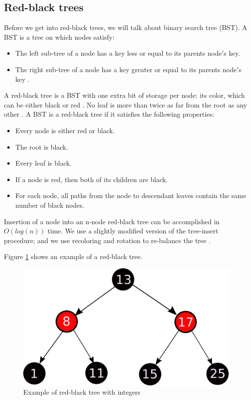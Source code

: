 \documentclass{sig-alternate-05-2015}
\begin{document}
    \subsection{Red-black trees}
      Before we get into red-black trees, we will talk about binary search tree (BST). A BST is a tree on which nodes satisfy:
      \begin{itemize}
        \item The left sub-tree of a node has a key less or equal to its parents node$'$s key.
        \item The right sub-tree of a node has a key greater or equal to its parents node$'$s key \cite{Tuto:Data}.
      \end{itemize}
      A red-black tree is a BST with one extra bit of storage per node: its color, which can be either black or red \cite{Cormen:Algorithms}.
      No leaf is more than twice as far from the root as any other \cite{Black:RBTree}.
      A BST is a red-black tree if it satisfies the following properties:
      \begin{itemize}
        \item Every node is either red or black.
        \item The root is black.
        \item Every leaf is black.
        \item If a node is red, then both of its children are black.
        \item For each node, all paths from the node to descendant leaves contain the same number of black nodes.
      \end{itemize}
      Insertion of a node into an n-node red-black tree can be accomplished in $O(log(n))$
      time. We use a slightly modified version of the tree-insert procedure; and we use recoloring and rotation to re-balance the tree \cite{Cormen:Algorithms}.

      Figure \ref{img:RBTree} shows an example of a red-black tree.

      \begin{figure}[H]
        \centering
        \includegraphics[scale=0.35]{RBTree.pdf}
        \caption{Example of red-black tree with integers}
        \label{img:RBTree}
      \end{figure}
\end{document}
